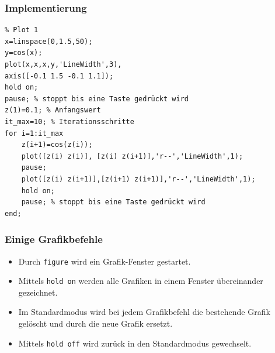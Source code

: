 %
%
\begin{frame}[fragile]\frametitle{Implementierung}
\begin{lstlisting}
% Plot 1
x=linspace(0,1.5,50);
y=cos(x);
plot(x,x,x,y,'LineWidth',3),
axis([-0.1 1.5 -0.1 1.1]);
hold on;
pause; % stoppt bis eine Taste gedrückt wird
z(1)=0.1; % Anfangswert
it_max=10; % Iterationsschritte 
for i=1:it_max
    z(i+1)=cos(z(i));
    plot([z(i) z(i)], [z(i) z(i+1)],'r--','LineWidth',1);
    pause;
    plot([z(i) z(i+1)],[z(i+1) z(i+1)],'r--','LineWidth',1);
    hold on;
    pause; % stoppt bis eine Taste gedrückt wird
end;
\end{lstlisting}
\end{frame}
%
%
\begin{frame}[fragile]\frametitle{Einige Grafikbefehle}
\begin{itemize}
\item Durch \alert{ \lstinline!figure!} wird ein Grafik-Fenster gestartet.
\item Mittels \alert{ \lstinline!hold on!} werden alle Grafiken in einem Fenster
  \"ubereinander gezeichnet. 
\item Im Standardmodus wird bei jedem Grafikbefehl die bestehende Grafik
  gel\"oscht und durch die neue Grafik ersetzt.
\item Mittels \alert{ \lstinline!hold off!} wird zur\"uck in den Standardmodus
  gewechselt.  
\end{itemize}
\end{frame}

